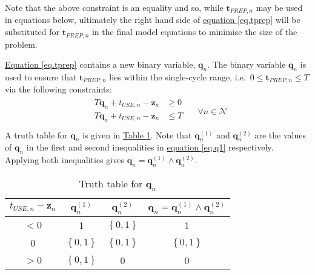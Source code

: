 Note that the above constraint is an equality and so, while
$\boldsymbol{t}_{\mathit{PREP},n}$ may be used in equations below, ultimately
the right hand side of \hyperref[eq.tprep]{equation \ref*{eq.tprep}}
will be substituted for $\boldsymbol{t}_{\mathit{PREP},n}$ in the final model
equations to minimise the size of the problem.

\hyperref[eq.tprep]{Equation \ref*{eq.tprep}} contains a new binary 
variable, $\boldsymbol{q}_{n}$.
The binary variable $\boldsymbol{q}_{n}$ is used to ensure that
$\boldsymbol{t}_{\mathit{PREP},n}$ lies within the single-cycle range, i.e.\
$0 \le \boldsymbol{t}_{\mathit{PREP},n} \le T$ via the following constraints:
\begin{equation}
    \begin{split}
        \begin{alignedat}{2}
            T \boldsymbol{q}_{n} + t_{\mathit{USE},n} - \boldsymbol{z}_{n} &\ge
            0\\
            T \boldsymbol{q}_{n} + t_{\mathit{USE},n} - \boldsymbol{z}_{n} &\le
            T\\
        \end{alignedat}
    \end{split}
    \quad \forall n \in \mathcal{N}
    \label{eq.q1}
\end{equation}
A truth table for $\boldsymbol{q}_{n}$ is given in
\hyperref[tbl.truthq]{Table \ref*{tbl.truthq}}.
Note that $\boldsymbol{q}_{n}^{\left( 1 \right)}$ and 
$\boldsymbol{q}_{n}^{\left( 2 \right)}$ are the values of $\boldsymbol{q}_{n}$
in the first and second inequalities in \hyperref[eq.q1]{equation \ref*{eq.q1}}
respectively. Applying both inequalities gives
$\boldsymbol{q}_{n} = \boldsymbol{q}_{n}^{\left( 1 \right)} \land
 \boldsymbol{q}_{n}^{\left( 2 \right)}$.
\begin{table}[h!]
    \centering
    \caption{Truth table for $\boldsymbol{q}_{n}$}
    \label{tbl.truthq}
    \begin{tabular}{c | c c | c}
        $t_{\mathit{USE},n} - \boldsymbol{z}_{n}$
        & $\boldsymbol{q}_{n}^{\left( 1 \right)}$
        & $\boldsymbol{q}_{n}^{\left( 2 \right)}$
        & $\boldsymbol{q}_{n} = \boldsymbol{q}_{n}^{\left( 1 \right)} \land
        \boldsymbol{q}_{n}^{\left( 2 \right)}$\\ \hline
        $<0$ & 1 & $\left\{ 0,1 \right\}$ & 1\\
        0 & $\left\{ 0,1 \right\}$ & $\left\{ 0,1 \right\}$
            & $\left\{ 0,1 \right\}$\\
        $>0$ & $\left\{ 0,1 \right\}$ & 0 & 0\\
    \end{tabular}
\end{table}


